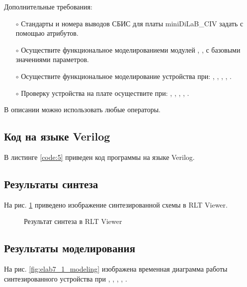 Дополнительные требования:
\begin{itemize}
	\item[$\circ$] Стандарты и номера выводов СБИС для платы miniDiLaB\_CIV задать с помощью атрибутов.
	\item[$\circ$] Осуществите функциональное моделированиеми  модулей , ,  с базовыми значениями параметров.
	\item[$\circ$] Осуществите функциональное моделирование устройства при: , , , , .
	\item[$\circ$] Проверку устройства на плате осуществите при: , , , , .
\end{itemize}
В описании можно использовать любые операторы.

\subsection{Код на языке Verilog}

В листинге \ref{code:5} приведен код программы на языке Verilog.

%

\subsection{Результаты синтеза}

На рис. \ref{fig:elab7_1_rtl} приведено изображение синтезированной схемы в RLT Viewer.

\begin{figure}[H]
\begin{center}
	\caption{Результат синтеза в RLT Viewer}
	\label{fig:elab7_1_rtl}
\end{center}
\end{figure}

\subsection{Результаты моделирования}
\label{sec:elab7_1_modeling}

На рис. \ref{fig:elab7_1_modeling} изображена временная диаграмма работы синтезированного устройства при , , , , .

